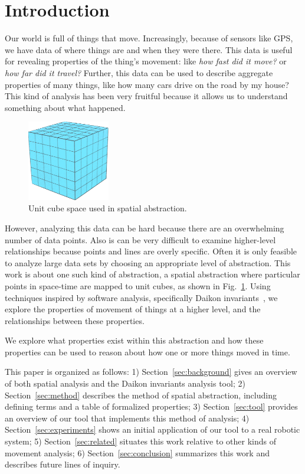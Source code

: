 \section{Introduction}

Our world is full of things that move.
Increasingly, because of sensors like GPS, we have data of where things are and when they were there.
This data is useful for revealing properties of the thing's movement: like \emph{how fast did it move?} or \emph{how far did it travel?}
Further, this data can be used to describe aggregate properties of many things, like how many cars drive on the road by my house?
This kind of analysis has been very fruitful because it allows us to understand something about what happened.

\begin{figure}
  \centering
  \includegraphics[width=0.32\textwidth]{./figures/unitCube}
  \caption{Unit cube space used in spatial abstraction.}
  \label{fig:unitCubes}
\end{figure}

However, analyzing this data can be hard because there are an overwhelming number of data points.
Also is can be very difficult to examine higher-level relationships because points and lines are overly specific.  
Often it is only feasible to analyze large data sets by choosing an appropriate level of abstraction.
This work is about one such kind of abstraction, a spatial abstraction where particular points in space-time are mapped to unit cubes, as shown in Fig.~\ref{fig:unitCubes}.
Using techniques inspired by software analysis, specifically Daikon invariants~\cite{kataoka2001automated}, we explore the properties of movement of things at a higher level, and the relationships between these properties.

We explore what properties exist within this abstraction and how these properties can be used to reason about how one or more things moved in time.

This paper is organized as follows:
1) Section~\ref{sec:background} gives an overview of both spatial analysis and the Daikon invariants analysis tool;
2) Section~\ref{sec:method} describes the method of spatial abstraction, including defining terms and a table of formalized properties;
3) Section~\ref{sec:tool} provides an overview of our tool that implements this method of analysis;
4) Section~\ref{sec:experiments} shows an initial application of our tool to a real robotic system;
5) Section~\ref{sec:related} situates this work relative to other kinds of movement analysis;
6) Section~\ref{sec:conclusion} summarizes this work and describes future lines of inquiry. 




